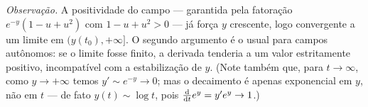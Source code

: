 \medskip
\emph{Observação.} A positividade do campo --- garantida pela fatoração $e^{-y}(1-u+u^2)$ com $1-u+u^2>0$ --- já força $y$ crescente, logo convergente a um limite em $(y(t_0),+\infty]$. O segundo argumento é o usual para campos autônomos: se o limite fosse finito, a derivada tenderia a um valor estritamente positivo, incompatível com a estabilização de $y$. (Note também que, para $t\to\infty$, como $y\to+\infty$ temos $y'\sim e^{-y}\to0$; mas o decaimento é apenas exponencial em $y$, não em $t$ --- de fato $y(t)\sim\log t$, pois $\tfrac{\mathrm{d}}{\mathrm{d} t}e^{y}=y'e^{y}\to1$.)
